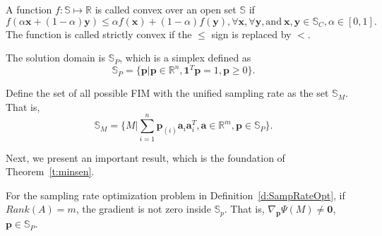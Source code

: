 
\begin{mdef} %
A function $f:\mathbb{S} \mapsto \mathbb{R}$ is called convex over an open set $\mathbb{S}$ if
$$ f(\alpha \mathbf{x} + (1-\alpha) \mathbf{y}) \leq \alpha f(\mathbf{x}) + (1-\alpha)f(\mathbf{y}), \forall \mathbf{x}, \forall\mathbf{y}, \mathrm{and\ } \mathbf{x},\mathbf{y}\in \mathbb{S}_C, \alpha \in [0, 1]. $$
The function is called strictly convex if the $\leq$ sign is replaced by $<$.
\end{mdef}

\begin{mdef}
The solution domain is $\mathbb{S}_P$, which is a simplex defined as
$$ \mathbb{S}_P = \{ \mathbf{p} |  \mathbf{p} \in\mathbb{R}^n, \mathbf{1}^T \mathbf{p}=1 , \mathbf{p} \geq 0 \} .$$
\end{mdef}


\begin{mdef}
Define the set of all possible FIM with
the unified sampling rate as the set $\mathbb{S}_{M}$. That is, $$
\mathbb{S}_{M}=\{ M|\sum_{i=1}^{n}\mathbf{p}_{(i)}\mathbf{a}_{i}\mathbf{a}_{i}^{T},
\mathbf{a}\in\mathbb{R}^{m}, \mathbf{p}\in\mathbb{S}_P \}.$$
\end{mdef}

Next, we present an important result, which is the foundation of Theorem~\ref{t:minsen}.

\begin{lem}\label{t:outofmin}
For the sampling rate optimization problem in Definition~\ref{d:SampRateOpt}, if $Rank(A)=m$, the gradient is not zero inside $\mathbb{S}_p$. That is, $\nabla_{\mathbf{p}} \Psi(M) \neq \mathbf{0}$, $\mathbf{p}\in \mathbb{S}_P$.
\end{lem}

